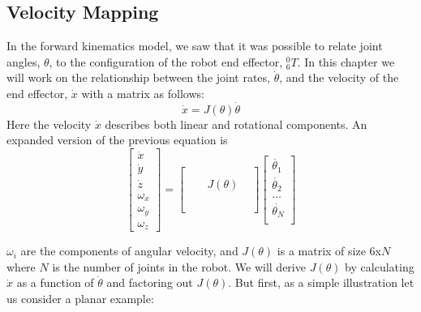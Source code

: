 \subsection{Velocity Mapping}
In the forward kinematics model, we saw that it was possible to relate joint angles, $\theta$, to the configuration of the robot end effector, $^0_6T$. In this chapter we will work on the relationship between the joint rates, $\dot{\theta}$, and the velocity of the end effector, $\dot{x}$ with a matrix as follows:
\[
\dot{x} = J(\theta)\dot{\theta}
\]
Here the velocity $\dot{x}$ describes both linear and rotational components.   An expanded version of the previous equation is
\[
\left [ \begin{array}{c}  \dot{x} \\[5pt]  \dot{y} \\[5pt] \dot{z} \\[5pt]
                          \omega_x \\[5pt] \omega_y \\[5pt] \omega_z
\end{array}  \right ]
=
\left [  \begin{array}{cccc}
 & & & \\
 & & & \\
 & & J(\theta) & \\
 & & & \\
 & & & \\
 & & & \\
\end{array} \right ]
\left [  \begin{array}{c}
\dot{\theta_1} \\[5pt]
\dot{\theta_2} \\[12pt]
\dots          \\[12pt]
\dot{\theta_N} \\[5pt]
\end{array} \right ]
\]

$\omega_i$ are the components of angular velocity, and $J(\theta)$ is a matrix of size 6x$N$ where $N$ is the number of joints in the robot. We will derive $J(\theta)$ by calculating $\dot{x}$ as a function of $\dot{\theta}$ and factoring out $J(\theta)$.  But first, as a simple illustration let us consider a   planar example:

